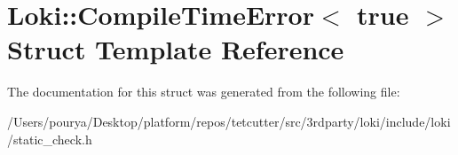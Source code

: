 \hypertarget{structLoki_1_1CompileTimeError_3_01true_01_4}{}\section{Loki\+:\+:Compile\+Time\+Error$<$ true $>$ Struct Template Reference}
\label{structLoki_1_1CompileTimeError_3_01true_01_4}


The documentation for this struct was generated from the following file\+:\begin{DoxyCompactItemize}
\item 
/\+Users/pourya/\+Desktop/platform/repos/tetcutter/src/3rdparty/loki/include/loki/static\+\_\+check.\+h\end{DoxyCompactItemize}
